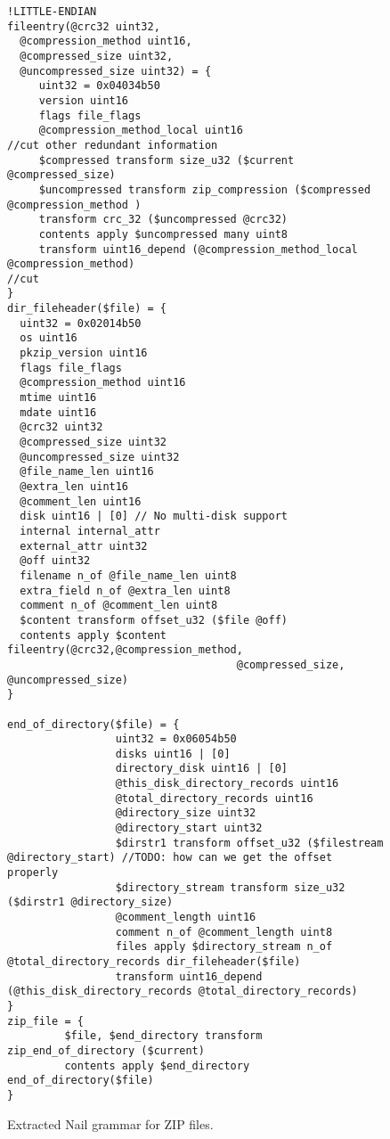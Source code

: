 \begin{figure}
\begin{verbatim}
!LITTLE-ENDIAN
fileentry(@crc32 uint32,
  @compression_method uint16,
  @compressed_size uint32, 
  @uncompressed_size uint32) = { 
     uint32 = 0x04034b50
     version uint16
     flags file_flags
     @compression_method_local uint16
//cut other redundant information 
     $compressed transform size_u32 ($current @compressed_size)
     $uncompressed transform zip_compression ($compressed @compression_method )
     transform crc_32 ($uncompressed @crc32)
     contents apply $uncompressed many uint8
     transform uint16_depend (@compression_method_local @compression_method)
//cut
}
dir_fileheader($file) = {
  uint32 = 0x02014b50
  os uint16
  pkzip_version uint16
  flags file_flags
  @compression_method uint16      
  mtime uint16
  mdate uint16
  @crc32 uint32
  @compressed_size uint32
  @uncompressed_size uint32
  @file_name_len uint16
  @extra_len uint16
  @comment_len uint16
  disk uint16 | [0] // No multi-disk support
  internal internal_attr
  external_attr uint32
  @off uint32
  filename n_of @file_name_len uint8
  extra_field n_of @extra_len uint8
  comment n_of @comment_len uint8
  $content transform offset_u32 ($file @off)
  contents apply $content fileentry(@crc32,@compression_method,
                                    @compressed_size, @uncompressed_size)
}

end_of_directory($file) = { 
                 uint32 = 0x06054b50
                 disks uint16 | [0]
                 directory_disk uint16 | [0]
                 @this_disk_directory_records uint16
                 @total_directory_records uint16
                 @directory_size uint32 
                 @directory_start uint32
                 $dirstr1 transform offset_u32 ($filestream @directory_start) //TODO: how can we get the offset properly
                 $directory_stream transform size_u32 ($dirstr1 @directory_size)
                 @comment_length uint16
                 comment n_of @comment_length uint8
                 files apply $directory_stream n_of @total_directory_records dir_fileheader($file)
                 transform uint16_depend (@this_disk_directory_records @total_directory_records)
}
zip_file = { 
         $file, $end_directory transform zip_end_of_directory ($current)
         contents apply $end_directory end_of_directory($file)
}
\end{verbatim}
\caption{Extracted Nail grammar for ZIP files.}
\label{fig:zip-extract}
\end{figure}
